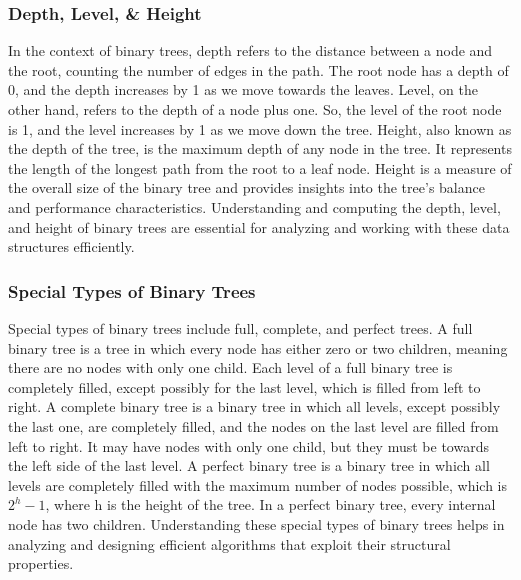 \subsubsection{Depth, Level, \& Height}

In the context of binary trees, depth refers to the distance between a node and the root, counting the number of edges in the path. The root node has a depth of 0, and the depth increases by 1 as we move towards the leaves. Level, on the other hand, refers to the depth of a node plus one. So, the level of the root node is 1, and the level 
increases by 1 as we move down the tree. Height, also known as the depth of the tree, is the maximum depth of any node in the tree. It represents the length of the longest path from the root to a leaf node. Height is a measure of the overall size of the binary tree and provides insights into the tree's balance and performance characteristics. 
Understanding and computing the depth, level, and height of binary trees are essential for analyzing and working with these data structures efficiently.

\subsubsection{Special Types of Binary Trees}

Special types of binary trees include full, complete, and perfect trees. A full binary tree is a tree in which every node has either zero or two children, meaning there are no nodes with only one child. Each level of a full binary tree is completely filled, except possibly for the last level, which is filled from left to right. 
A complete binary tree is a binary tree in which all levels, except possibly the last one, are completely filled, and the nodes on the last level are filled from left to right. It may have nodes with only one child, but they must be towards the left side of the last level. A perfect binary tree is a binary tree in which all levels 
are completely filled with the maximum number of nodes possible, which is $2^{h}-1$, where h is the height of the tree. In a perfect binary tree, every internal node has two children. Understanding these special types of binary trees helps in analyzing and designing efficient algorithms that exploit their structural properties.

